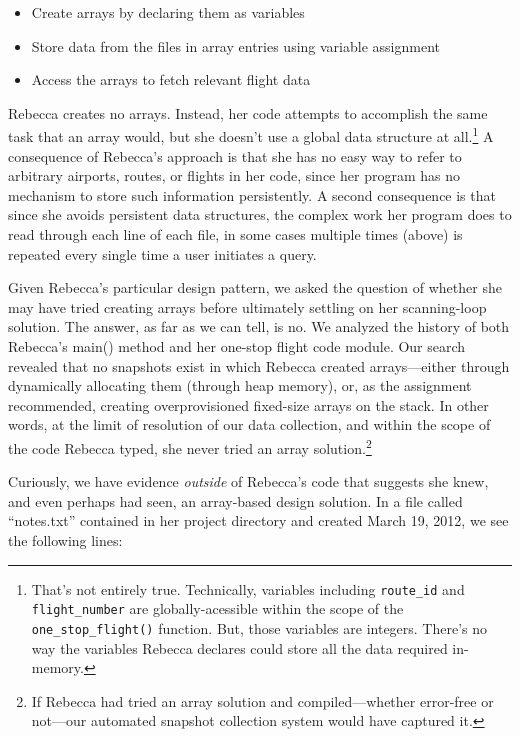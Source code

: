 \begin{itemize}
\tightlist
\item
  Create arrays by declaring them as variables
\item
  Store data from the files in array entries using variable assignment
\item
  Access the arrays to fetch relevant flight data
\end{itemize}

Rebecca creates no arrays. Instead, her code attempts to accomplish the same task that an array would, but she doesn't use a global data structure at all.\footnote{That's not entirely true. Technically, variables including \texttt{route\_id} and \texttt{flight\_number} are globally-acessible within the scope of the \texttt{one\_stop\_flight()} function. But, those variables are integers. There's no way the variables Rebecca declares could store all the data required in-memory.} A consequence of Rebecca's approach is that she has no easy way to refer to arbitrary airports, routes, or flights in her code, since her program has no mechanism to store such information persistently. A second consequence is that since she avoids persistent data structures, the complex work her program does to read through each line of each file, in some cases multiple times (above) is repeated every single time a user initiates a query.

Given Rebecca's particular design pattern, we asked the question of whether she may have tried creating arrays before ultimately settling on her scanning-loop solution. The answer, as far as we can tell, is no. We analyzed the history of both Rebecca's main() method and her one-stop flight code module. Our search revealed that no snapshots exist in which Rebecca created arrays---either through dynamically allocating them (through heap memory), or, as the assignment recommended, creating overprovisioned fixed-size arrays on the stack. In other words, at the limit of resolution of our data collection, and within the scope of the code Rebecca typed, she never tried an array solution.\footnote{If Rebecca had tried an array solution and compiled---whether error-free or not---our automated snapshot collection system would have captured it.}

Curiously, we have evidence \emph{outside} of Rebecca's code that suggests she knew, and even perhaps had seen, an array-based design solution. In a file called ``notes.txt'' contained in her project directory and created March 19, 2012, we see the following lines:

